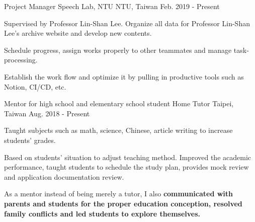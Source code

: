 

\begin{cventries}

  \cventry
    {Project Manager} %
    {Speech Lab, NTU} %
    {NTU, Taiwan} %
    {Feb. 2019 - Present} %
    {
      \begin{cvitems} %
        \item {Supervised by Professor Lin-Shan Lee. Organize all data for Professor Lin-Shan Lee's archive website and develop new contents.}
        \item {Schedule progress, assign works properly to other teammates and manage task-processing.}
        \item {Establish the work flow and optimize it by pulling in productive tools such as Notion, CI/CD, etc.}
      \end{cvitems}
    }

  \cventry
    {Mentor for high school and elementary school student} %
    {Home Tutor} %
    {Taipei, Taiwan} %
    {Aug. 2018 - Present} %
    {
      \begin{cvitems} %
        \item {Taught subjects such as math, science, Chinese, article writing
            to increase students' grades.}
        \item {Based on students' situation to adjust teaching method. 
                Improved the academic performance, taught students to schedule the study plan,
              provides mock review and application documentation review.}
        \item {As a mentor instead of being merely a tutor, I also
            \textbf{communicated with parents and students for the proper education conception, 
        resolved family conflicts and led students to explore themselves.}}
      \end{cvitems}
    }

 

\end{cventries}
